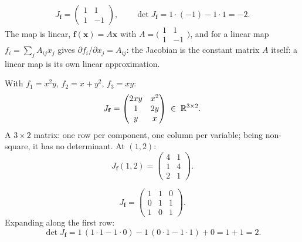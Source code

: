 \begin{solutions}
  \item
        \[
          J_{\mathbf{f}}=\begin{pmatrix}1&1\\1&-1\end{pmatrix},\qquad
          \det J_{\mathbf{f}}=1\cdot(-1)-1\cdot 1=-2 .
        \]
        The map is linear, $\mathbf{f}(\mathbf{x})=A\mathbf{x}$ with
        $A=\bigl(\begin{smallmatrix}1&1\\1&-1\end{smallmatrix}\bigr)$,
        and for a linear map $f_{i}=\sum_{j}A_{ij}x_{j}$ gives
        $\partial f_{i}/\partial x_{j}=A_{ij}$: the Jacobian is the
        constant matrix $A$ itself: a linear map is its own linear
        approximation.

  \item With $f_{1}=x^{2}y$, $f_{2}=x+y^{2}$, $f_{3}=xy$:
        \[
          J_{\mathbf{f}}=\begin{pmatrix}2xy&x^{2}\\1&2y\\y&x\end{pmatrix}
          \;\in\;\mathbb{R}^{3\times 2} .
        \]
        A $3\times 2$ matrix: one row per component, one column per
        variable; being non-square, it has no determinant. At $(1,2)$:
        \[
          J_{\mathbf{f}}(1,2)=\begin{pmatrix}4&1\\1&4\\2&1\end{pmatrix} .
        \]

  \item
        \[
          J_{\mathbf{f}}=\begin{pmatrix}1&1&0\\0&1&1\\1&0&1\end{pmatrix} .
        \]
        Expanding along the first row:
        \[
          \det J_{\mathbf{f}}
            =1\,(1\cdot 1-1\cdot 0)-1\,(0\cdot 1-1\cdot 1)+0
            =1+1=2 .
        \]


\end{solutions}
